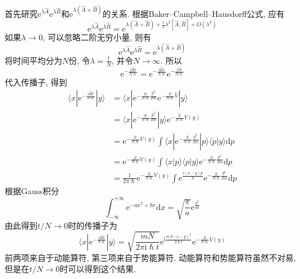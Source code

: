         首先研究$\mathrm{e}^{\lambda \hat{A}}\mathrm{e}^{\lambda \hat{B}}$和$\mathrm{e}^{\lambda (\hat{A}+\hat{B})}$的关系. 根据Baker–Campbell–Hausdorff公式, 应有
        \begin{equation}
            \mathrm{e}^{\lambda \hat{A}} \mathrm{e}^{\lambda \hat{B}} = \mathrm{e}^{\lambda (\hat{A}+\hat{B}) + \frac 12 \lambda^2 [\hat{A},\hat{B}] + O(\lambda^2)}
        \end{equation}
        如果$\lambda \to 0$, 可以忽略二阶无穷小量, 则有
        \begin{equation}
            \mathrm{e}^{\lambda \hat{A}} \mathrm{e}^{\lambda \hat{B}} = \mathrm{e}^{\lambda (\hat{A}+\hat{B})}
        \end{equation}
        将时间平均分为$N$份, 令$\lambda = \frac tN$, 并令$N \to \infty$. 所以
        \begin{equation}
            \mathrm{e}^{-\frac {\mathrm{i}\hat{H}t}{N\hslash}} = \mathrm{e}^{-\frac {\mathrm{i}\hat{K}t}{N\hslash}} \mathrm{e}^{-\frac {\mathrm{i}\hat{V}t}{N\hslash}}
        \end{equation}
        代入传播子, 得到
        \begin{equation}\begin{aligned}
            \langle x | \mathrm{e}^{-\frac {\mathrm{i}\hat{H}t}{N\hslash}} | y \rangle &= \langle x | \mathrm{e}^{-\frac {\mathrm{i}t}{N\hslash}\frac {\hat{p}^2}{2m}} 
            \mathrm{e}^{-\frac {\mathrm{i}t}{N\hslash}\hat{V}} |y \rangle\\
            &= \langle x | \mathrm{e}^{- \frac{\mathrm{i}t}{N\hslash} \frac{\hat{p}^2}{2m}} |y \rangle \mathrm{e}^{-\frac {\mathrm{i}t}{N\hslash}V(y)} \\
            &= \mathrm{e}^{-\frac {\mathrm{i}t}{N\hslash}V(y)} \int \langle x | \mathrm{e}^{-\frac {\mathrm{i}t}{N\hslash}\frac {\hat{p}^2}{2m}} |p \rangle \langle p |y \rangle \mathrm{d}p \\
            &= \mathrm{e}^{-\frac {\mathrm{i}t}{N\hslash}V(y)} \int \langle x|p \rangle \langle p|y \rangle \mathrm{e}^{-\frac {\mathrm{i}t}{N\hslash}\frac {p^2}{2m}} \mathrm{d}p\\
            &= \frac 1{2\pi \hslash} \mathrm{e}^{-\frac {\mathrm{i}t}{N\hslash}V(y)} \int \mathrm{e}^{\frac {\mathrm{i}(x-y)p}{\hslash}} \mathrm{e}^{-\frac {\mathrm{i}t}{N\hslash}\frac {p^2}{2m}} \mathrm{d} p
        \end{aligned}\end{equation}
        根据Gauss积分
        \begin{equation}
            \int_{-\infty}^{+\infty} \mathrm{e}^{-ax^2+bx} \mathrm{d}x = \sqrt{\frac {\pi}a} \mathrm{e}^{\frac {b^2}{4a}}
        \end{equation}
        由此得到$t/N \to 0$时的传播子为
        \begin{equation}
            \langle x | \mathrm{e}^{-\frac {\mathrm{i}\hat{H}t}{N\hslash}} | y \rangle = \sqrt{\frac {mN}{2\pi\mathrm{i} \hslash t}} \mathrm{e}^{\mathrm{i}\frac {mN(x-y)^2}{2\hslash t}}\mathrm{e}^{-\frac {\mathrm{i}t}{N\hslash} V(y)}
        \end{equation}
        前两项来自于动能算符, 第三项来自于势能算符. 动能算符和势能算符虽然不对易, 但是在$t/N \to 0$时可以得到这个结果. 

